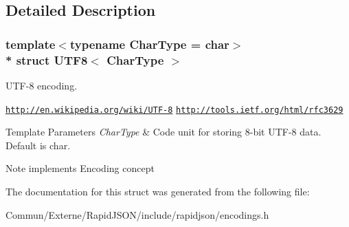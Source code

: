 \subsection{Detailed Description}
\subsubsection*{template$<$typename Char\+Type = char$>$\\*
struct U\+T\+F8$<$ Char\+Type $>$}

U\+T\+F-\/8 encoding. 

\href{http://en.wikipedia.org/wiki/UTF-8}{\tt http\+://en.\+wikipedia.\+org/wiki/\+U\+T\+F-\/8} \href{http://tools.ietf.org/html/rfc3629}{\tt http\+://tools.\+ietf.\+org/html/rfc3629} 
\begin{DoxyTemplParams}{Template Parameters}
{\em Char\+Type} & Code unit for storing 8-\/bit U\+T\+F-\/8 data. Default is char. \\
\hline
\end{DoxyTemplParams}
\begin{DoxyNote}{Note}
implements Encoding concept 
\end{DoxyNote}


The documentation for this struct was generated from the following file\+:\begin{DoxyCompactItemize}
\item 
Commun/\+Externe/\+Rapid\+J\+S\+O\+N/include/rapidjson/encodings.\+h\end{DoxyCompactItemize}
